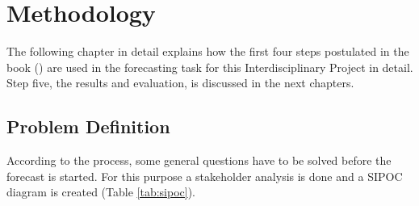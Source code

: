 \chapter{Methodology}\label{chapter:Methodology}
The following chapter in detail explains how the first four steps postulated in the book (\cite{Hyndman.2013}) are used in the forecasting task for this Interdisciplinary Project in detail. Step five, the results and evaluation, is discussed in the next chapters.\newline
\section{Problem Definition}\label{section:Problem Definition}
According to the process, some general questions have to be solved before the forecast is started. For this purpose a stakeholder analysis is done and a SIPOC diagram is created (Table \ref{tab:sipoc}).

